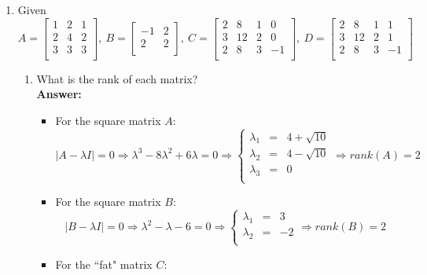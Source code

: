 \documentclass[letterpaper,11pt]{article}
\begin{document}
\begin{enumerate}
\item Given\\
\begin{equation}
\nonumber
A=\left[\begin{array}{ccc}
1 & 2 & 1 \\
2 & 4 & 2 \\
3 & 3 & 3 \\
\end{array}\right],~
B=\left[\begin{array}{cc}
-1 & 2 \\
2 & 2 \\
\end{array}\right],~
C=\left[\begin{array}{cccc}
2 & 8 & 1 & 0 \\
3 & 12 & 2 & 0 \\
2 & 8 & 3 & -1 \\
\end{array}\right],~
D=\left[\begin{array}{cccc}
2 & 8 & 1 & 1 \\
3 & 12 & 2 & 1 \\
2 & 8 & 3 & -1 \\
\end{array}\right]
\end{equation}
\begin{enumerate}
	\item What is the rank of each matrix?\\
	\textbf{Answer:}
	\begin{itemize}
		\item For the square matrix $A$:
		$$|A - \lambda I|=0 \Rightarrow \lambda^3 - 8 \lambda^2 + 6\lambda = 0 \Rightarrow \left\{\begin{array}{rcl}
		\lambda_1 & = & 4+\sqrt{10} \\
		\lambda_2 & = & 4-\sqrt{10} \\
		\lambda_3 & = & 0 \\
		\end{array}\right. \Rightarrow rank(A)=2$$
		\item For the square matrix $B$:
		$$|B - \lambda I|=0 \Rightarrow \lambda^2 - \lambda - 6 = 0 \Rightarrow
		\left\{\begin{array}{rcl}
		\lambda_1 & = & 3 \\
		\lambda_2 & = & -2 \\
		\end{array}\right. \Rightarrow rank(B)=2$$
		\item For the ``fat" matrix $C$:

\end{itemize}
\end{enumerate}
\end{enumerate}
\end{document}
